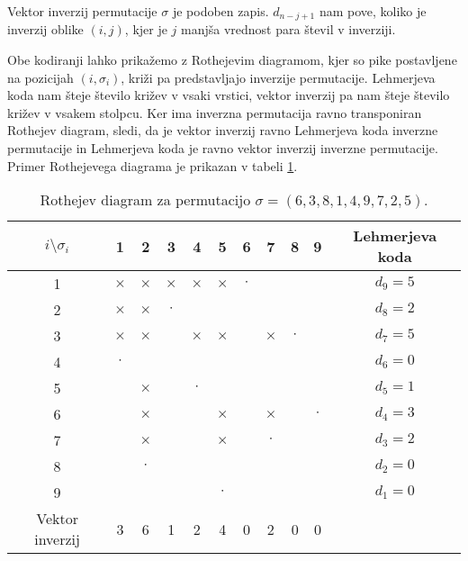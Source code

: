 \documentclass[a4paper, 12pt]{book}
\begin{document}
Vektor inverzij permutacije $\sigma$ je podoben zapis. $d_{n-j+1}$ nam pove, koliko je inverzij oblike $(i, j)$, kjer je $j$ manjša vrednost para števil v inverziji.

Obe kodiranji lahko prikažemo z Rothejevim diagramom, kjer so pike postavljene na pozicijah $(i, \sigma_i)$, križi pa predstavljajo inverzije permutacije. Lehmerjeva koda nam šteje število križev v vsaki vrstici, vektor inverzij pa nam šteje število križev v vsakem stolpcu. Ker ima inverzna permutacija ravno transponiran Rothejev diagram, sledi, da je vektor inverzij ravno Lehmerjeva koda inverzne permutacije in Lehmerjeva koda je ravno vektor inverzij inverzne permutacije. Primer Rothejevega diagrama je prikazan v tabeli \ref{tbl:rothejev_diagram}.

\begin{table}[h]
    \begin{center}
        \begin{tabular}{ |c|c|c|c|c|c|c|c|c|c|c| } 
        \hline
            $i \setminus \sigma_i$ & 1 & 2 & 3 & 4 & 5 & 6 & 7 & 8 & 9 & Lehmerjeva koda  \\ 
        \hline
            1 & $\times$ & $\times$ & $\times$ & $\times$ & $\times$ & $\cdot$ & & & & $d_9 = 5$  \\ 
        \hline
            2 & $\times$ & $\times$ & $\cdot$ & & & & & & & $d_8 = 2$  \\ 
        \hline
            3 & $\times$ & $\times$ & & $\times$ & $\times$ & & $\times$ & $\cdot$ & & $d_7 = 5$  \\ 
        \hline
            4 & $\cdot$ & & & & & & & & & $d_6 = 0$  \\ 
        \hline
            5 & & $\times$ & & $\cdot$ & & & & & & $d_5 = 1$  \\ 
        \hline
            6 & & $\times$ & & & $\times$ & & $\times$ & & $\cdot$ & $d_4 = 3$  \\ 
        \hline
            7 & & $\times$ & & & $\times$ & & $\cdot$ & & & $d_3 = 2$  \\ 
        \hline
            8 & & $\cdot$ & & & & & & & & $d_2 = 0$  \\ 
        \hline
            9 & & & & & $\cdot$ & & & & & $d_1 = 0$  \\ 
        \hline
            Vektor inverzij & 3 & 6 & 1 & 2 & 4 & 0 & 2 & 0 & 0 &  \\ 
        \hline
        \end{tabular}
    \end{center}
    \caption{ Rothejev diagram za permutacijo $\sigma = (6, 3, 8, 1, 4, 9, 7, 2, 5)$. }
    \label{tbl:rothejev_diagram}
\end{table}
\end{document}
